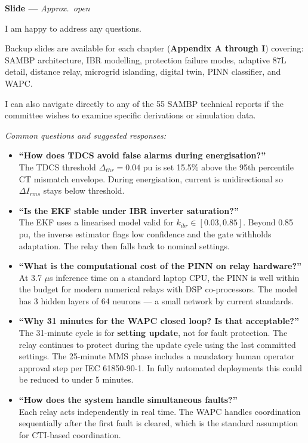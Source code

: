 \documentclass[12pt, a4paper]{article}
\newenvironment{notebox}{%
  \begin{tcolorbox}[
    colback=noteBg,
    colframe=iitmMaroon!40,
    boxrule=0.6pt,
    arc=3pt,
    left=8pt, right=8pt, top=6pt, bottom=6pt
  ]
  \setstretch{1.4}\small
}{%
  \end{tcolorbox}
}
\newcommand{\slidetag}[2]{%
  \noindent
  \textcolor{slideNum}{\footnotesize\bfseries Slide #1} \hfill
  \textcolor{iitmGold!80!black}{\footnotesize\itshape Approx.\ #2}\\[2pt]
}
\begin{document}
\slidetag{---}{open}
\begin{notebox}
I am happy to address any questions.

Backup slides are available for each chapter (\textbf{Appendix A through I}) covering:
SAMBP architecture, IBR modelling, protection failure modes, adaptive 87L detail,
distance relay, microgrid islanding, digital twin, PINN classifier, and WAPC.

I can also navigate directly to any of the 55 SAMBP technical reports if the committee
wishes to examine specific derivations or simulation data.

\textit{Common questions and suggested responses:}
\begin{itemize}[leftmargin=1.5em, itemsep=4pt]
  \item \textbf{``How does TDCS avoid false alarms during energisation?''}\\
        The TDCS threshold $\Delta_{thr} = 0.04$ pu is set 15.5\% above the 95th
        percentile CT mismatch envelope. During energisation, current is unidirectional
        so $\Delta I_{rms}$ stays below threshold.

  \item \textbf{``Is the EKF stable under IBR inverter saturation?''}\\
        The EKF uses a linearised model valid for $k_{ibr} \in [0.03, 0.85]$. Beyond
        0.85 pu, the inverse estimator flags low confidence and the gate withholds
        adaptation. The relay then falls back to nominal settings.

  \item \textbf{``What is the computational cost of the PINN on relay hardware?''}\\
        At 3.7 $\mu$s inference time on a standard laptop CPU, the PINN is well within
        the budget for modern numerical relays with DSP co-processors. The model has
        3 hidden layers of 64 neurons --- a small network by current standards.

  \item \textbf{``Why 31 minutes for the WAPC closed loop? Is that acceptable?''}\\
        The 31-minute cycle is for \textbf{setting update}, not for fault protection.
        The relay continues to protect during the update cycle using the last committed
        settings. The 25-minute MMS phase includes a mandatory human operator approval
        step per IEC 61850-90-1. In fully automated deployments this could be reduced
        to under 5 minutes.

  \item \textbf{``How does the system handle simultaneous faults?''}\\
        Each relay acts independently in real time. The WAPC handles coordination
        sequentially after the first fault is cleared, which is the standard assumption
        for CTI-based coordination.
\end{itemize}
\end{notebox}
\end{document}
